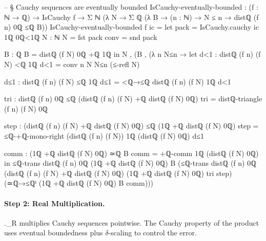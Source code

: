 \documentclass[11pt,a4paper]{book}
\def\cdot{.}%
\def\mathbb#1{#1}%
\def\texttt#1{#1}%
\def\ensuremath#1{#1}%
\begin{document}
\begin{code}
-- § Cauchy sequences are eventually bounded
IsCauchy-eventually-bounded :
  (f : ℕ → ℚ) → IsCauchy f →
  Σ ℕ (λ N → Σ ℚ (λ B → (n : ℕ) → N ≤ n → distℚ (f n) 0ℚ ≤ℚ B))
IsCauchy-eventually-bounded f ic =
  let
    pack = IsCauchy.cauchy ic 1ℚ 0ℚ<1ℚ
    N : ℕ
    N = fst pack
    conv = snd pack

    B : ℚ
    B = distℚ (f N) 0ℚ +ℚ 1ℚ
  in
  N , (B , (λ n N≤n →
    let
      d<1 : distℚ (f n) (f N) <ℚ 1ℚ
      d<1 = conv n N N≤n (≤-refl N)

      d≤1 : distℚ (f n) (f N) ≤ℚ 1ℚ
      d≤1 = <ℚ→≤ℚ {distℚ (f n) (f N)} {1ℚ} d<1

      tri : distℚ (f n) 0ℚ ≤ℚ (distℚ (f n) (f N) +ℚ distℚ (f N) 0ℚ)
      tri = distℚ-triangle (f n) (f N) 0ℚ

      step : (distℚ (f n) (f N) +ℚ distℚ (f N) 0ℚ) ≤ℚ (1ℚ +ℚ distℚ (f N) 0ℚ)
      step = ≤ℚ-+ℚ-mono-right (distℚ (f n) (f N)) 1ℚ (distℚ (f N) 0ℚ) d≤1

      comm : (1ℚ +ℚ distℚ (f N) 0ℚ) ≃ℚ B
      comm = +ℚ-comm 1ℚ (distℚ (f N) 0ℚ)
    in
    ≤ℚ-trans {distℚ (f n) 0ℚ} {(1ℚ +ℚ distℚ (f N) 0ℚ)} {B}
      (≤ℚ-trans {distℚ (f n) 0ℚ} {(distℚ (f n) (f N) +ℚ distℚ (f N) 0ℚ)} {(1ℚ +ℚ distℚ (f N) 0ℚ)} tri step)
      (≃ℚ→≤ℚˡ {(1ℚ +ℚ distℚ (f N) 0ℚ)} {B} comm)))
\end{code}

\paragraph{Step 2: Real Multiplication.}
\texttt{\ensuremath{\cdot_{\mathbb{R}}}} multiplies Cauchy sequences
pointwise. The Cauchy property of the product uses eventual boundedness
plus $\delta$-scaling to control the error.
\end{document}
